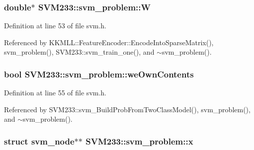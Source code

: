 \subsubsection[{\texorpdfstring{W}{W}}]{\setlength{\rightskip}{0pt plus 5cm}double$\ast$ S\+V\+M233\+::svm\+\_\+problem\+::W}\hypertarget{struct_s_v_m233_1_1svm__problem_a499ec12b246a796ab0951be8dab5cec5}{}\label{struct_s_v_m233_1_1svm__problem_a499ec12b246a796ab0951be8dab5cec5}


Definition at line 53 of file svm.\+h.



Referenced by K\+K\+M\+L\+L\+::\+Feature\+Encoder\+::\+Encode\+Into\+Sparse\+Matrix(), svm\+\_\+problem(), S\+V\+M233\+::svm\+\_\+train\+\_\+one(), and $\sim$svm\+\_\+problem().

\subsubsection[{\texorpdfstring{we\+Own\+Contents}{weOwnContents}}]{\setlength{\rightskip}{0pt plus 5cm}bool S\+V\+M233\+::svm\+\_\+problem\+::we\+Own\+Contents}\hypertarget{struct_s_v_m233_1_1svm__problem_a2ba090314d6e55344388630a2f10f655}{}\label{struct_s_v_m233_1_1svm__problem_a2ba090314d6e55344388630a2f10f655}


Definition at line 55 of file svm.\+h.



Referenced by S\+V\+M233\+::svm\+\_\+\+Build\+Prob\+From\+Two\+Class\+Model(), svm\+\_\+problem(), and $\sim$svm\+\_\+problem().

\subsubsection[{\texorpdfstring{x}{x}}]{\setlength{\rightskip}{0pt plus 5cm}struct {\bf svm\+\_\+node}$\ast$$\ast$ S\+V\+M233\+::svm\+\_\+problem\+::x}\hypertarget{struct_s_v_m233_1_1svm__problem_a79a6083544d0f446a643167950c7e285}{}\label{struct_s_v_m233_1_1svm__problem_a79a6083544d0f446a643167950c7e285}


